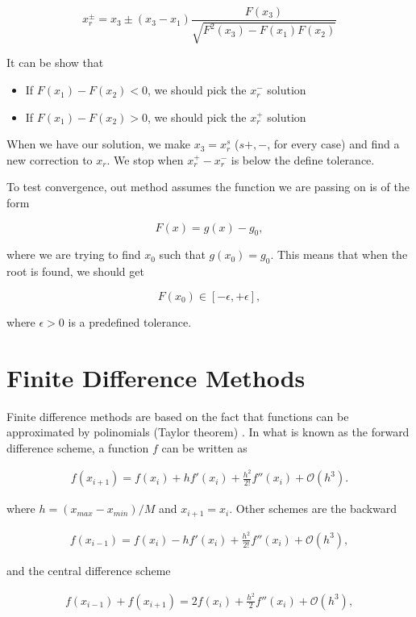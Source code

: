 $$x_r^{\pm} = x_3 \pm (x_3-x_1)\frac{F(x_3)}{\sqrt{F^2(x_3)-F(x_1)F(x_2)}}$$

It can be show that 
\begin{itemize}
\item If $F(x_1)-F(x_2) < 0$, we should pick the $x_r^-$ solution
\item If $F(x_1)-F(x_2) > 0$, we should pick the $x_r^+$ solution
\end{itemize}

When we have our solution, we make $x_3 = x_r^{s}$ ($s+,-$, for every case) and find a new correction to $x_r$. We stop when $x_r^+-x_r^-$ is below the define tolerance.

To test convergence, out method assumes the function we are passing on is of the form

$$F(x) = g(x) -g_0,$$

where we are trying to find $x_0$ such that $g(x_0) = g_0$. This means that when the root is found, we should get 

$$F(x_0) \in [-\epsilon,+\epsilon],$$

where $\epsilon>0$ is a predefined tolerance.


\section{Finite Difference Methods}

\par Finite difference methods are based on the fact that functions can be approximated by polinomials (Taylor theorem) \cite{kiusalaas}. In what is known as the forward difference scheme, a function $f$ can be written as

\begin{align}
	\label{eq:forward-difference}
	f(x_{i+1})=f(x_i) + hf '(x_i) + \frac{h^2}{2!} f''(x_i) + \mathcal{O}(h^3).
\end{align}

where $h = (x_{max}-x_{min})/M$ and $x_{i+1} = x_i$. Other  schemes are the backward 

\begin{align}
\label{eq:backward-difference}
	f(x_{i-1})=f(x_i) - hf '(x_i) + \frac{h^2}{2!} f''(x_i) + \mathcal{O}(h^3),
\end{align}

and the central difference scheme


\begin{align}
\label{eq:central-difference}
	f(x_{i-1}) + f(x_{i+1})= 2f(x_i) + \frac{h^2}{2}f''(x_i) + \mathcal{O}(h^3),
\end{align}


